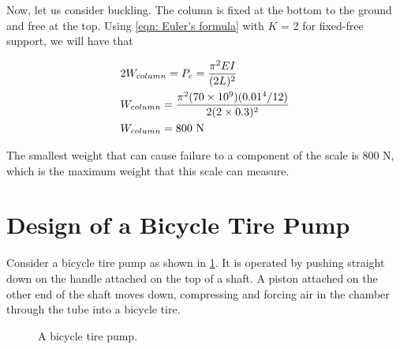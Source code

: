 \documentclass[
10pt,
a4paper,
openany,
svgnames,
]{book}
\begin{document}
Now, let us consider buckling. The column is fixed at the bottom to the ground and free at the top. Using \cref{eqn: Euler's formula} with $K$ = 2 for fixed-free support, we will have that 

\[\begin{gathered}
  2W_{column} = P_c = \frac{\pi ^2EI}{(2L)^2} \hfill \\
  W_{column} = \frac{\pi ^2(70 \times 10^9)(0.01^4/12)}{2(2 \times 0.3)^2} \hfill \\
  W_{column} = 800\text{ N} \hfill \\ 
\end{gathered} \]

The smallest weight that can cause failure to a component of the scale is 800 N, which is the maximum weight that this scale can measure.

\section{Design of a Bicycle Tire Pump}

Consider a bicycle tire pump as shown in \cref{fig: bike pump}. It is operated by pushing straight down on the handle attached on the top of a shaft. A piston attached on the other end of the shaft moves down, compressing and forcing air in the chamber through the tube into a bicycle tire.

\begin{figure}[h]
  \centering
  \caption{A bicycle tire pump.}
  \label{fig: bike pump}
\end{figure}
\end{document}
